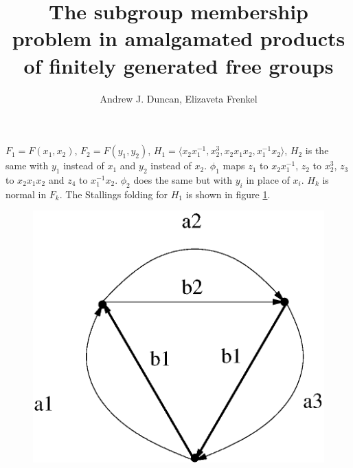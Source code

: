 \documentclass[a4paper,12pt]{article}
\title{The subgroup membership problem in amalgamated products of 
finitely generated free groups
}
\author{Andrew J. Duncan, Elizaveta Frenkel}
\numberwithin{equation}{section}
\numberwithin{figure}{section}
\newcommand{\la}{\langle}
\newcommand{\ra}{\rangle}
\begin{document}
$F_1=F( x_1,x_2)$, $F_2=F(y_1, y_2)$, $H_1=\la x_2x_1^{-1}, x_2^3, x_2x_1x_2,
x_1^{-1}x_2\ra$, $H_2$ is the same with $y_1$ instead of $x_1$ and $y_2$ instead
of $x_2$. $\phi_1$ maps $z_1$ to $  x_2x_1^{-1}$, $z_2$ to $x_2^3$, $z_3$ to 
 $x_2x_1x_2$ and $z_4$ to $x_1^{-1}x_2$. $\phi_2$ does the same but 
with $y_i$ in place of $x_i$. $H_k$ is normal in $F_k$.
The Stallings folding for $H_1$ is shown in figure \ref{fig:fold}.
\begin{figure}
\begin{center}
\includegraphics[scale=0.6]{ce.eps}
\caption{}\label{fig:fold}
\end{center}
\end{figure}
\\[1em]
\end{document}
